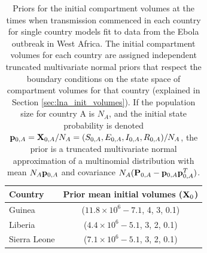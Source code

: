 \begin{table}[htbp]
	\caption[Priors for initial compartment volumes for a stratified SEIR model fit to data from the Ebola outbreak in West Africa.]{Priors for the initial compartment volumes at the times when transmission commenced in each country for single country models fit to data from the Ebola outbreak in West Africa. The initial compartment volumes for each country are assigned independent truncated multivariate normal priors that respect the boundary conditions on the state space of compartment volumes for that country (explained in Section \ref{sec:lna_init_volumes}). If the population size for country A is $ N_A $, and the initial state probability is denoted $ \mathbf{p}_{0,A} = \mathbf{X}_{0,A}/N_A  = (S_{0,A}, E_{0,A}, I_{0,A}, R_{0,A})/N_A$, the prior is a truncated multivariate normal approximation of a multinomial distribution with mean $ N_A\mathbf{p}_{0,A}$ and covariance $ N_A(\mathbf{P}_{0,A} - \mathbf{p}_{0,A}\mathbf{p}_{0,A}^T) $.} 
	\label{tab:ebola_joint_initdist_priors}
	\centering
	\begin{tabular}{lc}
		\hline \textbf{Country} & \textbf{Prior mean initial volumes} ($ \mathbf{X}_0 $) \\
		\hline
		Guinea & ($ 11.8\times10^6 -7.1$, 4, 3, 0.1) \\
		Liberia & ($ 4.4\times10^6 -5.1$, 3, 2, 0.1) \\
		Sierra Leone & ($ 7.1\times10^6 -5.1$, 3, 2, 0.1) \\
		\hline
	\end{tabular}
\end{table}


